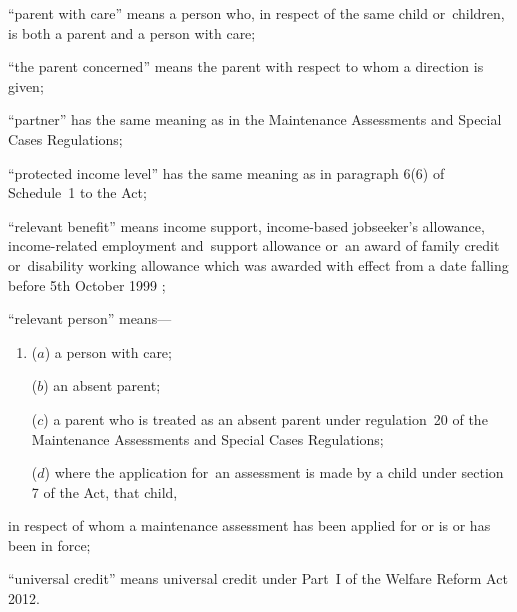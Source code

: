 \documentclass[a4paper,12pt]{article}
\begin{document}
\begin{enumerate}
“parent with care” means a person who, in respect of the same child or~children, is both a parent and a person with care;

“the parent concerned” means the parent with respect to whom a direction is given;

“partner” has the same meaning as in the Maintenance Assessments and Special Cases Regulations;

“protected income level” has the same meaning as in paragraph 6(6) of Schedule~1 to the Act;

“relevant benefit” means income support, 
income-based jobseeker’s allowance,  %
income-related employment and~support allowance  %
or~an award of family credit or~disability working allowance which was awarded with effect from a date falling before 5th October 1999%
;

“relevant person” means—
\begin{enumerate}\item[]
($a$) a person with care;

($b$) an absent parent;

($c$) a parent who is treated as an absent parent under regulation~20 of the Maintenance Assessments and Special Cases Regulations;

($d$) where the application for~an assessment is made by a child under section 7 of the Act, that child,
\end{enumerate}
in respect of whom a maintenance assessment has been applied for or is or has been in force;

“universal credit” means universal credit under Part~I of the Welfare Reform Act 2012.
\end{enumerate}
\end{document}
